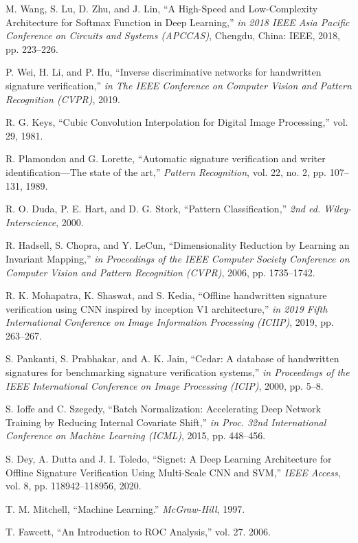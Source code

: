 \begin{thebibliography}{10}
M. Wang, S. Lu, D. Zhu, and J. Lin, ``A High-Speed and Low-Complexity Architecture for Softmax Function in Deep Learning,'' {\em in 2018 IEEE Asia Pacific Conference on Circuits and Systems (APCCAS)}, Chengdu, China: IEEE,
2018, pp. 223--226.

P. Wei, H. Li, and P. Hu, ``Inverse discriminative networks for handwritten signature verification,'' {\em in The IEEE Conference on Computer Vision and Pattern Recognition (CVPR)},
2019.

R. G. Keys, ``Cubic Convolution Interpolation for Digital Image Processing,'' vol. 29,
1981.

R. Plamondon and G. Lorette, ``Automatic signature verification and writer identification—The state of the art,'' {\em Pattern Recognition}, vol. 22, no. 2, pp. 107--131,
1989.

R. O. Duda, P. E. Hart, and D. G. Stork, ``Pattern Classification,'' {\em 2nd ed. Wiley-Interscience},
2000.

R. Hadsell, S. Chopra, and Y. LeCun, ``Dimensionality Reduction by Learning an Invariant Mapping,'' {\em in Proceedings of the IEEE Computer Society Conference on Computer Vision and Pattern Recognition (CVPR)},
2006, pp. 1735--1742.

R. K. Mohapatra, K. Shaswat, and S. Kedia, ``Offline handwritten signature verification using CNN inspired by inception V1 architecture,'' {\em in 2019 Fifth International Conference on Image Information Processing (ICIIP)},
2019, pp. 263--267.

S. Pankanti, S. Prabhakar, and A. K. Jain, ``Cedar: A database of handwritten signatures for benchmarking signature verification systems,'' {\em in Proceedings of the IEEE International Conference on Image Processing (ICIP)},
2000, pp. 5--8.

S. Ioffe and C. Szegedy, ``Batch Normalization: Accelerating Deep Network Training by Reducing Internal Covariate Shift,'' {\em in Proc. 32nd International Conference on Machine Learning (ICML)},
2015, pp. 448--456.

S. Dey, A. Dutta and J. I. Toledo, ``Signet: A Deep Learning Architecture for Offline Signature Verification Using Multi-Scale CNN and SVM,'' {\em IEEE Access}, vol. 8, pp. 118942--118956,
2020.

T. M. Mitchell, ``Machine Learning.'' {\em McGraw-Hill},
1997.

T. Fawcett, ``An Introduction to ROC Analysis,'' vol. 27.
2006.


\end{thebibliography}

